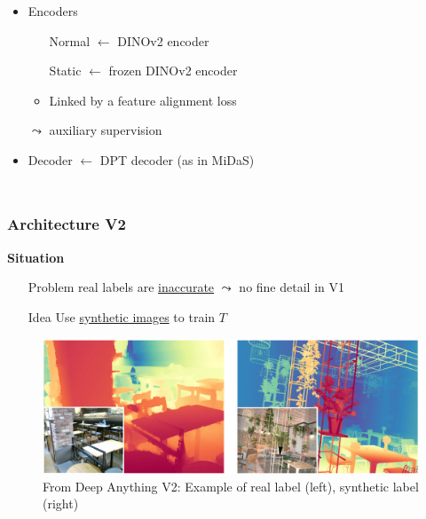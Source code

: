 \documentclass[12pt]{beamer}
\begin{document}
\begin{frame}
\begin{columns}
\begin{itemize}
            \item<3-> Encoders
            \begin{itemize}
                \item[Normal] $\leftarrow$ DINOv2 encoder
                \item[Static] $\leftarrow$ frozen DINOv2 encoder
                \item Linked by a feature alignment loss
            \end{itemize}
            $\leadsto$ auxiliary supervision
            
            \item<4-> Decoder $\leftarrow$ DPT decoder (as in MiDaS)
            
        \end{itemize}
    \end{columns}
    
\end{frame}

\begin{frame}
    \frametitle{Architecture V2}
    
    \textbf{Situation}
    \begin{itemize}
        \item[Problem] real labels are \underline{inaccurate} $\leadsto$ no fine detail in V1
        \item[Idea] Use \underline{synthetic images} to train $T$
    \end{itemize}
    \pause
    \begin{figure}
        \centering
        \includegraphics[width=\textwidth]{./figures/screeenshot_deepanythingv2_realvssynth.png}
        \caption{From Deep Anything V2: Example of real label (left), synthetic label (right)}
        \label{fig:realvssynth}
    \end{figure}
\end{frame}
\end{document}
